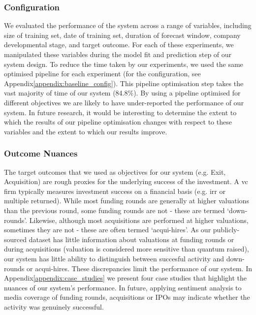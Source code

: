 \documentclass[../thesis/thesis.tex]{subfiles}
\begin{document}
\subsubsection{Configuration}

We evaluated the performance of the system across a range of variables, including size of training set, date of training set, duration of forecast window, company developmental stage, and target outcome. For each of these experiments, we manipulated these variables during the model fit and prediction step of our system design. To reduce the time taken by our experiments, we used the same optimised pipeline for each experiment (for the configuration, see Appendix\ref{appendix:baseline_config}). This pipeline optimisation step takes the vast majority of time of our system (84.8\%). By using a pipeline optimised for different objectives we are likely to have under-reported the performance of our system. In future research, it would be interesting to determine the extent to which the results of our pipeline optimisation changes with respect to these variables and the extent to which our results improve.

\subsubsection{Outcome Nuances}

The target outcomes that we used as objectives for our system (e.g. Exit, Acquisition) are rough proxies for the underlying success of the investment. A \gls{vc} firm typically measures investment success on a financial basis (e.g. \gls{irr} or multiple returned). While most funding rounds are generally at higher valuations than the previous round, some funding rounds are not - these are termed `down-rounds'. Likewise, although most acquisitions are performed at higher valuations, sometimes they are not - these are often termed `acqui-hires'. As our publicly-sourced dataset has little information about valuations at funding rounds or during acquisitions (valuation is considered more sensitive than quantum raised), our system has little ability to distinguish between succesful activity and down-rounds or acqui-hires. These discrepancies limit the performance of our system. In Appendix\ref{appendix:case_studies} we present four case studies that highlight the nuances of our system's performance. In future, applying sentiment analysis to media coverage of funding rounds, acquisitions or IPOs may indicate whether the activity was genuinely successful.
\end{document}
